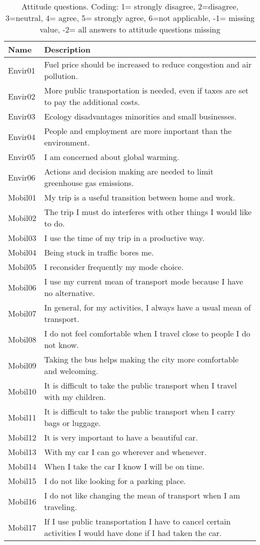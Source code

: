 \documentclass[12pt,a4paper]{article}
\begin{document}
\begin{longtable}{||p{4cm}|p{9cm}||}
\caption{\label{tab:indic}Attitude questions. Coding: 1= strongly disagree, 2=disagree,
  3=neutral, 4= agree, 5= strongly agree, 6=not applicable, -1=
  missing value, -2= all answers to attitude questions missing} \\
\hline 
\hline 
\textbf{Name} & \textbf{Description}\\
\hline 
Envir01 & Fuel price should be increased to reduce congestion and air pollution. \tabularnewline
\hline 
Envir02 & More public transportation is needed, even if taxes are set to pay the additional costs.\tabularnewline
\hline 
Envir03 & Ecology disadvantages minorities and small businesses.\tabularnewline
\hline 
Envir04 & People and employment are more important than the environment.\tabularnewline
\hline 
Envir05 & I am concerned about global warming.\tabularnewline
\hline 
Envir06 & Actions and decision making are needed to limit greenhouse gas emissions.\tabularnewline
\hline 
Mobil01 & My trip is a useful transition between home and work.\tabularnewline
\hline 
Mobil02 & The trip I must do interferes with other things I would like to do. \tabularnewline
\hline 
Mobil03 & I use the time of my trip in a productive way.\tabularnewline
\hline 
Mobil04 & Being stuck in traffic bores me.\tabularnewline
\hline 
Mobil05 & I reconsider frequently my mode choice.\tabularnewline
\hline 
Mobil06 & I use my current mean of transport mode because I have no alternative.\tabularnewline
\hline 
Mobil07 & In general, for my activities, I always have a usual mean of transport.\tabularnewline
\hline 
Mobil08 & I do not feel comfortable when I travel close to people I do not know.\tabularnewline
\hline 
Mobil09 & Taking the bus helps making the city more comfortable and welcoming.\tabularnewline
\hline 
Mobil10 & It is difficult to take the public transport when I travel with my children.\tabularnewline
\hline 
Mobil11 & It is difficult to take the public transport when I carry bags or luggage.\tabularnewline
\hline 
Mobil12 & It is very important to have a beautiful car.\tabularnewline
\hline 
Mobil13 & With my car I can go wherever and whenever.\tabularnewline
\hline 
Mobil14 & When I take the car I know I will be on time.\tabularnewline
\hline 
Mobil15 & I do not like looking for a parking place. \tabularnewline
\hline 
Mobil16 & I do not like changing the mean of transport when I am traveling.\tabularnewline
\hline 
Mobil17 & If I use public transportation I have to cancel certain activities I would have done if I had taken the car. \tabularnewline

\end{longtable}
\end{document}
